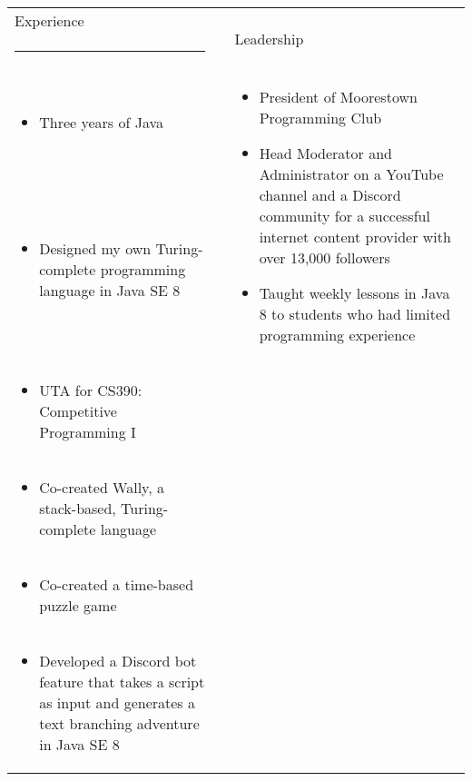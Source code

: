\begin{tabular}{p{4.42in}cp{2.8in}}
	{\fontfamily{lmdh}\fontsize{24}{28.8}\selectfont Experience} && \multirow{2}{*}{
			{\fontfamily{lmdh}\fontsize{24}{28.8}\selectfont Leadership}
		}\\
	\rule{175pt}{2pt} && \multirow{2}{*}{\rule{175pt}{2pt}}\\
	\vspace{-10pt}
	\raggedright
	
	\begin{itemize}
		\item Three years of Java
	\end{itemize} &\multirow{2}{*}{\rule{.5pt}{200pt}}
		& \multirow{2}{2.8in}{
			\flushleft
			\begin{itemize}
				\item President of Moorestown Programming Club
				\item Head Moderator and Administrator on a YouTube channel and a Discord community for a successful internet content provider with over 13,000 followers
				\item Taught weekly lessons in Java 8 to students who had limited programming experience 
			\end{itemize}
		}\\
	\vspace{-30pt}
	\raggedright
	\begin{itemize}
		\item Designed my own Turing-complete programming language in Java SE 8
	\end{itemize} && \\
	\vspace{-30pt}
	\raggedright
	\begin{itemize}
		\item UTA for CS390: Competitive Programming I
	\end{itemize} && \\
	\vspace{-30pt}
	\raggedright
	\begin{itemize}
		\item Co-created Wally, a stack-based, Turing-complete language
	\end{itemize} && \\
	\vspace{-30pt}
	\raggedright
	\begin{itemize}
		\item Co-created a time-based puzzle game
	\end{itemize} && \\
	\vspace{-30pt}
	\raggedright
	\begin{itemize}
		\item Developed a Discord bot feature that takes a script as input and generates a text branching adventure in Java SE 8
	\end{itemize} && \\
\end{tabular}\\
